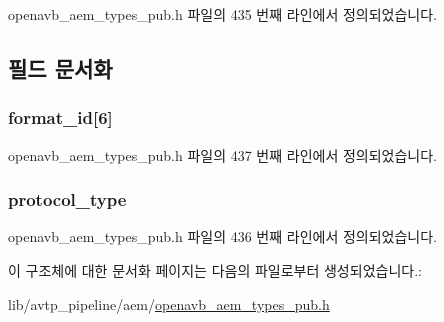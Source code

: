 openavb\+\_\+aem\+\_\+types\+\_\+pub.\+h 파일의 435 번째 라인에서 정의되었습니다.



\subsection{필드 문서화}
\subsubsection[{\texorpdfstring{format\+\_\+id}{format_id}}]{ format\+\_\+id\mbox{[}6\mbox{]}}\hypertarget{structopenavb__aem__stream__format__avtp__control__t_ae1ff7c8bfecfa86c9ab47966bf21d53e}{}\label{structopenavb__aem__stream__format__avtp__control__t_ae1ff7c8bfecfa86c9ab47966bf21d53e}


openavb\+\_\+aem\+\_\+types\+\_\+pub.\+h 파일의 437 번째 라인에서 정의되었습니다.

\subsubsection[{\texorpdfstring{protocol\+\_\+type}{protocol_type}}]{ protocol\+\_\+type}\hypertarget{structopenavb__aem__stream__format__avtp__control__t_af5a53e85f700bf2bed8a66c37a52e208}{}\label{structopenavb__aem__stream__format__avtp__control__t_af5a53e85f700bf2bed8a66c37a52e208}


openavb\+\_\+aem\+\_\+types\+\_\+pub.\+h 파일의 436 번째 라인에서 정의되었습니다.



이 구조체에 대한 문서화 페이지는 다음의 파일로부터 생성되었습니다.\+:\begin{DoxyCompactItemize}
\item 
lib/avtp\+\_\+pipeline/aem/\hyperlink{openavb__aem__types__pub_8h}{openavb\+\_\+aem\+\_\+types\+\_\+pub.\+h}\end{DoxyCompactItemize}
